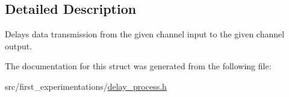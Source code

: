 \subsection{Detailed Description}
Delays data transmission from the given channel input to the given channel output. 

The documentation for this struct was generated from the following file\-:\begin{DoxyCompactItemize}
\item 
src/first\-\_\-experimentations/\hyperlink{delay__process_8h}{delay\-\_\-process.\-h}\end{DoxyCompactItemize}
